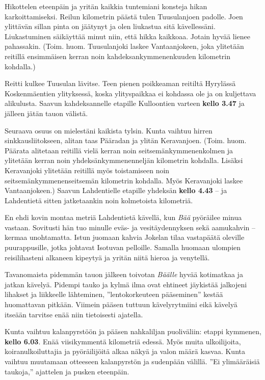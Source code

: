 \begin{multicols}{2}
Hikottelen eteenpäin ja yritän kaikkia tuntemiani konsteja hikan karkoittamiseksi. Reilun kilometrin päästä tulen Tuusulanjoen padolle. Joen ylittävän sillan pinta on jäätynyt ja olen liukastua sitä kävellessäni. Liukastuminen säikäyttää minut niin, että hikka kaikkoaa. Jotain hyvää lienee pahassakin. (Toim. huom. Tuusulanjoki laskee Vantaanjokeen, joka ylitetään reitillä ensimmäisen kerran noin kahdeksankymmenenkuuden kilometrin kohdalla.)

Reitti kulkee Tuusulan lävitse. Teen pienen poikkeaman reitiltä Hyrylässä Koskenmäentien ylityksessä, koska ylityspaikkaa ei kohdassa ole ja on kuljettava alikulusta. Saavun kahdeksannelle etapille Kulloontien varteen \textbf{kello 3.47} ja jälleen jätän tauon välistä. 

Seuraava osuus on mielestäni kaikista tylsin. Kunta vaihtuu hirren sinkkausliitokseen, alitan taas Pääradan ja ylitän Keravanjoen. (Toim. huom. Päärata alitetaan reitillä vielä kerran noin seitsemänkymmenenkolmen ja ylitetään kerran noin yhdeksänkymmenenneljän kilometrin kohdalla. Lisäksi Keravanjoki ylitetään reitillä myös toistamiseen noin seitsemänkymmenenseitsemän kilometrin kohdalla. Myös Keravanjoki laskee Vantaanjokeen.) Saavun Lahdentielle etapille yhdeksän \textbf{kello 4.43} -- ja Lahdentietä sitten jatketaankin noin kolmetoista kilometriä. 

En ehdi kovin montaa metriä Lahdentietä kävellä, kun \textit{Bää} pyöräilee minua vastaan. Sovitusti hän tuo minulle eväs- ja vesitäydennyksen sekä aamukahvin -- kermaa unohtamatta. Istun juomaan kahvia Jokelan tilaa vastapäätä oleville puurappusille, jotka johtavat Isotuvan pelloille. Samalla huomaan ulompien reisilihasteni alkaneen kipeytyä ja yritän niitä hieroa ja venytellä. 

Tavanomaista pidemmän tauon jälkeen toivotan \textit{Bäälle} hyvää kotimatkaa ja jatkan kävelyä. Pidempi tauko ja kylmä ilma ovat ehtineet jäykistää jalkojeni lihakset ja liikkeelle lähteminen, ''lentokorkeuteen pääseminen'' kestää huomattavan pitkään. Viimein pääsen tuttuun kävelyrytmiini eikä kävelyä itseään tarvitse enää niin tietoisesti ajatella. 

Kunta vaihtuu kalanpyrstöön ja pääsen nahkaliljan puoliväliin: etappi kymmenen, \textbf{kello 6.03}. Enää viisikymmentä kilometriä edessä. Myös muita ulkoilijoita, koiranulkoiluttajia ja pyöräilijöitä alkaa näkyä ja valon määrä kasvaa. Kunta vaihtuu muutamaan otteeseen kalanpyrstön ja sudenpään välillä. ''Ei ylimääräisiä taukoja,'' ajattelen ja pusken eteenpäin.


\end{multicols}
